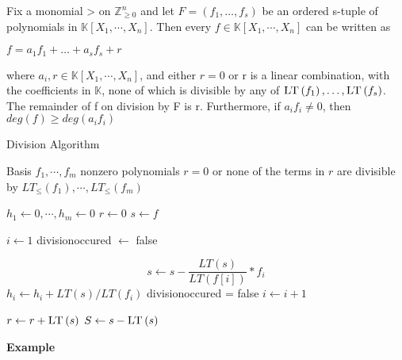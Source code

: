 \begin{theorem}
Fix a monomial > on $ \mathbb{Z}_{\geq 0}^{n}$ and let $ F = \left( f_{1}, \ldots, f_{s}\right) $ be an ordered s-tuple of polynomials in $ \mathbb{K}\left[X_{1}, \cdots, X_{n}\right]$. Then every  $ f \in \mathbb{K}\left[X_{1}, \cdots, X_{n}\right]$ can be written as
\begin{center}
$ f = a_{1}f_{1}+ \ldots + a_{s}f_{s} + r$
\end{center}
where $a_{i}, r \in \mathbb{K}\left[X_{1}, \cdots, X_{n}\right] $, and either $ r=0$ or r is a linear combination, with the coefficients in $\mathbb{K}$, none of which is divisible by any of
$\textsc{LT}\left(f_{1} \right), \ldots, \textsc{LT}\left(f_{s} \right)  $.
The remainder of f on division by F is r. Furthermore, if $a_{i}f_{i} \neq 0 $, then
$deg(f) \geq deg(a_{i}f_{i})$

\end{theorem}


\begin{algorithm}
\caption{Division Algorithm}\label{divisionalg}
\begin{algorithmic}[1]

\Require Basis $f_{1}, \cdots, f_{m}$ nonzero polynomials  
\Ensure $r=0$ or none of the terms in $r$ are divisible by $ LT_{\leq}\left( f_{1}\right) , \cdots , LT_{\leq} \left( f_{m}\right) $

\State $ h_{1} \gets 0 , \cdots , h_{m} \gets 0  $
\State $ r \gets 0 $
\State $ s \gets f $

\State $ i \gets 1 $
\State  division\textunderscore occured $ \gets $  false 

\State \[ s \gets s -  \frac{LT \left( s\right)}{LT \left( f \left[ i\right] \right)}  \ast f_{i} \]
\State $h_{i} \gets h_{i} + LT\left( s\right) / LT\left( f_{i}\right) $
\State division\textunderscore occured = false
\Else
\State $i \gets i+1$
\EndIf
\EndWhile

\State $ r \gets r + \textsc{LT}\left( s\right) $
\State $ S \gets s - \textsc{LT}\left( s\right) $
\EndIf

\EndWhile


\end{algorithmic}
\end{algorithm}


\textbf{Example}


